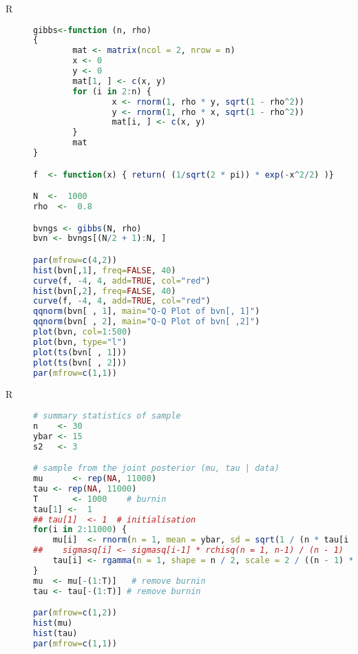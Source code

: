 \begin{description}



\item[R] 


\begin{lstlisting}[language=R]
gibbs<-function (n, rho) 
{
        mat <- matrix(ncol = 2, nrow = n)
        x <- 0
        y <- 0
        mat[1, ] <- c(x, y)
        for (i in 2:n) {
                x <- rnorm(1, rho * y, sqrt(1 - rho^2))
                y <- rnorm(1, rho * x, sqrt(1 - rho^2))
                mat[i, ] <- c(x, y)
        }
        mat
}

f  <- function(x) { return( (1/sqrt(2 * pi)) * exp(-x^2/2) )}

N  <-  1000
rho  <-  0.8

bvngs <- gibbs(N, rho)
bvn <- bvngs[(N/2 + 1):N, ]

par(mfrow=c(4,2))
hist(bvn[,1], freq=FALSE, 40)
curve(f, -4, 4, add=TRUE, col="red")
hist(bvn[,2], freq=FALSE, 40)
curve(f, -4, 4, add=TRUE, col="red")
qqnorm(bvn[ , 1], main="Q-Q Plot of bvn[, 1]")
qqnorm(bvn[ , 2], main="Q-Q Plot of bvn[ ,2]")
plot(bvn, col=1:500)
plot(bvn, type="l")
plot(ts(bvn[ , 1]))
plot(ts(bvn[ , 2]))
par(mfrow=c(1,1))
\end{lstlisting}
\item[R] 


\begin{lstlisting}[language=R]
# summary statistics of sample
n    <- 30
ybar <- 15
s2   <- 3

# sample from the joint posterior (mu, tau | data)
mu      <- rep(NA, 11000)
tau <- rep(NA, 11000)
T       <- 1000    # burnin
tau[1] <-  1
## tau[1]  <- 1  # initialisation
for(i in 2:11000) {   
    mu[i]  <- rnorm(n = 1, mean = ybar, sd = sqrt(1 / (n * tau[i - 1])))
##    sigmasq[i] <- sigmasq[i-1] * rchisq(n = 1, n-1) / (n - 1)
    tau[i] <- rgamma(n = 1, shape = n / 2, scale = 2 / ((n - 1) * s2 + n * (mu[i] - ybar)^2))
}
mu  <- mu[-(1:T)]   # remove burnin
tau <- tau[-(1:T)] # remove burnin

par(mfrow=c(1,2))
hist(mu)
hist(tau)
par(mfrow=c(1,1))
\end{lstlisting}  


\end{description}
